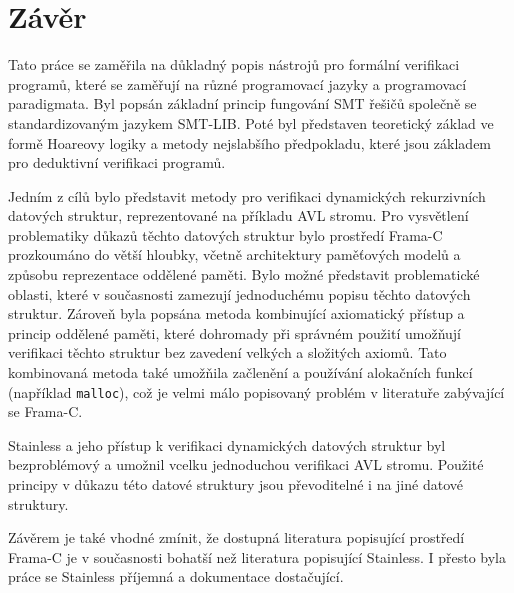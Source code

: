 \chapter*{Závěr}

Tato práce se zaměřila na důkladný popis nástrojů pro formální verifikaci programů,
které se zaměřují na různé programovací jazyky a programovací paradigmata.
Byl popsán základní princip fungování SMT řešičů společně se standardizovaným jazykem SMT-LIB\@.
Poté byl představen teoretický základ ve formě Hoareovy logiky a metody nejslabšího předpokladu,
které jsou základem pro deduktivní verifikaci programů.

Jedním z cílů bylo představit metody pro verifikaci dynamických rekurzivních datových struktur,
reprezentované na příkladu AVL stromu.
Pro vysvětlení problematiky důkazů těchto datových struktur
bylo prostředí Frama\mbox{-}C prozkoumáno do větší hloubky,
včetně architektury paměťových modelů a způsobu reprezentace oddělené paměti.
Bylo možné představit problematické oblasti,
které v současnosti zamezují jednoduchému popisu těchto datových struktur.
Zároveň byla popsána metoda kombinující axiomatický přístup a princip oddělené paměti,
které dohromady při správném použití umožňují verifikaci těchto struktur
bez zavedení velkých a složitých axiomů.
Tato kombinovaná metoda také umožňila začlenění a používání alokačních funkcí (například \texttt{malloc}),
což je velmi málo popisovaný problém v literatuře zabývající se Frama\mbox{-}C\@.

Stainless a jeho přístup k verifikaci dynamických datových struktur
byl bezproblémový a umožnil vcelku jednoduchou verifikaci AVL stromu.
Použité principy v důkazu této datové struktury jsou převoditelné
i na jiné datové struktury.

Závěrem je také vhodné zmínit, že dostupná literatura popisující prostředí Frama\mbox{-}C
je v současnosti bohatší než literatura popisující Stainless.
I přesto byla práce se Stainless příjemná a dokumentace dostačující.
